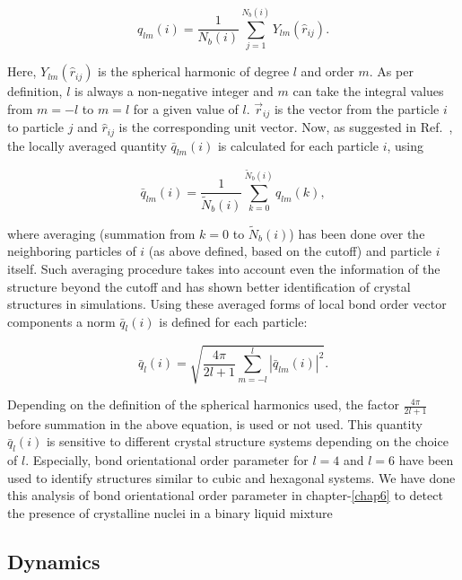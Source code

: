     \begin{equation}
    \label{qlm}
    q_{lm}(i) =\frac{1}{N_b(i)} \sum_{j=1}^{N_b(i)} Y_{lm}(\hat{r}_{ij}).
    \end{equation}
    
    Here, $Y_{lm}(\hat{r}_{ij})$ is the spherical harmonic of degree $l$ and order $m$. As per definition, $l$ is always a non-negative integer and $m$ can take the integral values from $m = -l$ to $m = l$ for a given value of $l$. $\vec{r}_{ij}$ is the vector from the particle $i$ to particle $j$ and $\hat{r}_{ij}$ is the corresponding unit vector. Now, as suggested in Ref.~\cite{dellago2008}, the locally averaged quantity $\bar{q}_{lm}(i)$ is calculated for each particle $i$, using

    \begin{equation}
    \bar{q}_{lm}(i) = \frac{1}{\tilde{N}_b(i)} \sum_{k=0}^{\tilde{N}_b(i)} q_{lm}(k),
    \end{equation}
    
    where averaging (summation from $k=0$ to $\tilde{N}_b(i)$) has been done over the neighboring particles of $i$ (as above defined, based on the cutoff) and particle $i$ itself. Such averaging procedure takes into account even the information of the structure beyond the cutoff and has shown better identification of crystal structures in simulations. Using these averaged forms of local bond order vector components a norm $\bar{q}_{l}(i)$ is defined for each particle:

    \begin{equation}
    \bar{q}_{l}(i) = \sqrt{\frac{4\pi}{2l+1} \sum_{m=-l}^{l} |\bar{q}_{lm}(i)|^2}.
    \end{equation}
    
    Depending on the definition of the spherical harmonics used, the factor $\frac{4\pi}{2l+1}$ before summation in the above equation, is used or not used. This quantity $\bar{q}_{l}(i)$ is sensitive to different crystal structure systems depending on the choice of $l$. Especially, bond orientational order parameter for $l = 4$ and $l = 6$ have been used to identify structures similar to cubic and hexagonal systems. We have done this analysis of bond orientational order parameter in chapter-\ref{chap6} to detect the presence of crystalline nuclei in a binary liquid mixture
    
    \subsection{Dynamics}\label{dynamics}
    
